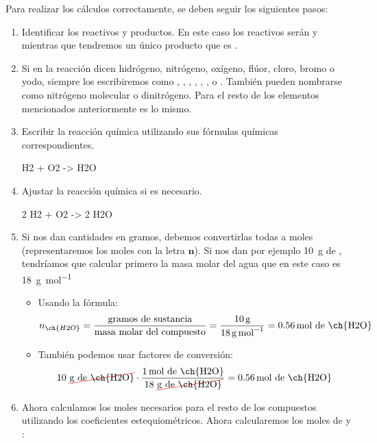 Para realizar los cálculos correctamente, se deben seguir los siguientes pasos:
\begin{enumerate}[label=\numberballmDarkTeal]
        \item Identificar los reactivos y productos.
        En este caso los reactivos serán  y  mientras que tendremos un único producto que es .
        \item Si en la reacción dicen hidrógeno, nitrógeno, oxígeno, flúor, cloro, bromo o yodo, siempre los escribiremos como , , , , , , o .
        También pueden nombrarse como nitrógeno molecular o dinitrógeno.
        Para el resto de los elementos mencionados anteriormente es lo mismo.
        \item Escribir la reacción química utilizando sus fórmulas químicas correspondientes.
        \begin{reaction*}
            H2 + O2 -> H2O
        \end{reaction*}
        \item Ajustar la reacción química si es necesario.
        \begin{reaction*}
            2 H2 + O2 -> 2 H2O
        \end{reaction*}
        \item Si nos dan cantidades en gramos, debemos convertirlas todas a moles (representaremos los moles con la letra \( \bm{n} \)).
        Si nos dan por ejemplo \qty{10}{\g} de , tendríamos que calcular primero la masa molar del agua que en este caso es \qty{18}{\g\per\mol}
        \begin{itemize}
            \item Usando la fórmula:
            \begin{equation*}
                n_{\ch{H2O}} = \dfrac{\text{gramos de sustancia}}{\text{masa molar del compuesto}} = \dfrac{\qty{10}{\g}}{\qty{18}{\g\per\mol}} = \qty{0.56}{\mol}\ \text{de \ch{H2O}}
            \end{equation*}
            \item También podemos usar factores de conversión:
            \begin{equation*}
                10\ \cancelred{\unit{\g}\ \text{de \ch{H2O}}} \cdot \dfrac{\qty{1}{\mol}\ \text{de \ch{H2O}}}{18\ \cancelred{\unit{\g} \ \text{de \ch{H2O}}}} = \qty{0.56}{\mol}\ \text{de \ch{H2O}}
            \end{equation*}
        \end{itemize}
        \item Ahora calculamos los moles necesarios para el resto de los compuestos utilizando los coeficientes estequiométricos.
        Ahora calcularemos los moles de  y :


\end{enumerate}
